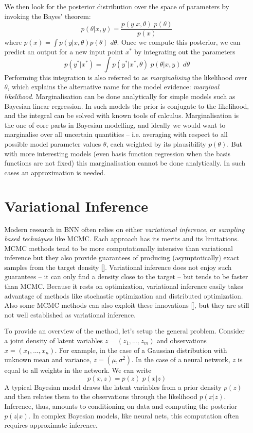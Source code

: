 We then look for the posterior distribution over the space of parameters by invoking the Bayes' theorem:
\begin{equation}
    p(\theta|x,y) = \frac{p(y|x, \theta) \; p(\theta)}{p(x)} \label{eq:posterior}
\end{equation}
where $p(x) = \int p(y|x, \theta) p(\theta)\; d\theta$. Once we compute this posterior, we can predict an output for a new input point $x^*$ by integrating out the parameters
$$p(y^*|x^*) = \int p(y^*|x^*, \theta) \; p(\theta|x,y) \; d\theta$$
Performing this integration is also referred to as \textit{marginalising} the likelihood over $\theta$, which explains the alternative name for the model evidence: \textit{marginal likelihood}. Marginalisation can be done analytically for simple models such as Bayesian linear regression. In such models the prior is conjugate to the likelihood, and the integral can be solved with known tools of calculus. Marginalisation is the one of core parts in Bayesian modelling, and ideally we would want to marginalise over all uncertain quantities -- i.e. averaging with respect to all possible model parameter values $\theta$, each weighted by its plausibility $p(\theta)$. But with more interesting models (even basis function regression when the basis functions are not fixed) this marginalisation cannot be done analytically. In such cases an approximation is needed.




\section{Variational Inference}\label{sec:VI}
Modern research in BNN often relies on either \textit{variational inference}, or \textit{sampling based techniques} like MCMC. Each approach has its merits and its limitations. MCMC methods tend to be more computationally intensive than variational inference but they also provide guarantees of producing (asymptotically) exact samples from the target density [\cite{RobertCasella2005}]. Variational inference does not enjoy such guarantees -- it can only find a density close to the target -- but tends to be faster than MCMC. Because it rests on optimization, variational inference easily takes advantage of methods like stochastic optimization and distributed optimization. Also some MCMC methods can also exploit these innovations [\cite{Welling2011}], but they are still not well established as variational inference. 

To provide an overview of the method, let's setup the general problem. Consider a joint density of latent variables $z = (z_1,\dots,z_m)$ and observations $x = (x_1,\dots, x_n)$. For example, in the case of a Gaussian distribution with unknown mean and variance, $z = (\mu, \sigma^2)$. In the case of a neural network, $z$ is equal to all weights in the network. We can write 
$$p(x,z) = p(z)\;p(x|z)$$
A typical Bayesian model draws the latent variables from a prior density $p(z)$ and then relates them to the observations through the likelihood $p(x|z)$. Inference, thus, amounts to conditioning on data and computing the posterior $p(z | x)$. In complex Bayesian models, like neural nets, this computation often requires approximate inference. 


